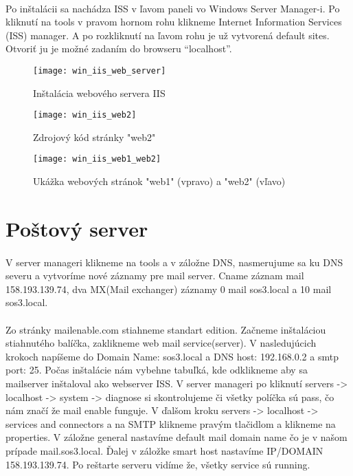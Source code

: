 \paragraph{}
Po inštalácii sa nachádza ISS v ľavom paneli vo Windows Server Manager-i. Po kliknutí na tools v pravom hornom rohu klikneme Internet Information Services (ISS) manager. A po rozkliknutí na ľavom rohu je už vytvorená default sites. Otvoriť ju je možné zadaním do browseru “localhost”.

\begin{figure}[!htb]
\centering
\texttt{[image: win\_iis\_web\_server]}
\caption{Inštalácia webového servera IIS}
\label{fig:x win_web}
\end{figure}

\begin{figure}[!htb]
\centering
\texttt{[image: win\_iis\_web2]}
\caption{Zdrojový kód stránky "web2"}
\label{fig:x win_web2_source}
\end{figure}

\begin{figure}[!htb]
\centering
\texttt{[image: win\_iis\_web1\_web2]}
\caption{Ukážka webových stránok "web1" (vpravo) a "web2" (vľavo)}
\label{fig:x win_web}
\end{figure}

\section{Poštový server}
\paragraph{}
V server manageri klikneme na tools a v záložne DNS, nasmerujume sa ku DNS severu a vytvoríme nové záznamy pre mail server. Cname záznam mail 158.193.139.74, dva MX(Mail exchanger) záznamy 0 mail sos3.local a 10 mail sos3.local.
\paragraph{}
Zo stránky mailenable.com stiahneme standart edition. Začneme inštaláciou stiahnutého balíčka, zaklikneme web mail service(server). V nasledujúcich krokoch napíšeme do Domain Name: sos3.local a DNS host: 192.168.0.2 a smtp port: 25. Počas inštalácie nám vybehne tabuľká, kde odklikneme aby sa mailserver inštaloval ako webserver ISS. V server manageri po kliknutí servers -> localhost -> system -> diagnose si skontrolujeme či všetky políčka sú pass, čo nám značí že mail enable funguje. V ďalšom kroku servers -> localhost -> services and connectors  a na SMTP klikneme pravým tlačidlom a klikneme na properties. V záložne general nastavíme default mail domain name čo je v našom prípade mail.sos3.local. Ďalej v záložke smart host nastavíme IP/DOMAIN 158.193.139.74. Po reštarte serveru vidíme že, všetky service sú running.

